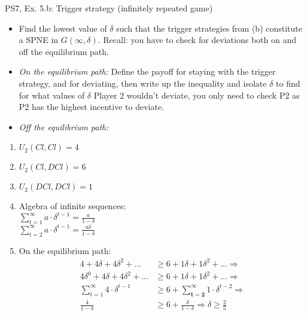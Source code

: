 \begin{frame}{PS7, Ex. 5.b: Trigger strategy (infinitely repeated game)}
    \begin{itemize}
        \item[(b)] Find the lowest value of $\delta$ such that the trigger strategies from (b) constitute a SPNE in $G(\infty,\delta)$. Recall: you have to check for deviations both on and off the equilibrium path.
    \end{itemize}
    \vspace{-8pt}
  \begin{multicols}{2}
    \begin{itemize}
        \item[(Step a)] \textit{On the equilibrium path:} Define the payoff for staying with the trigger strategy, and for deviating, then write up the inequality and isolate $\delta$ to find for what values of $\delta$ Player 2 wouldn't deviate, you only need to check P2 as P2 has the highest incentive to deviate.
        \item[(Step b)] \textit{Off the equilibrium path:}
    \end{itemize}
    \vfill\null\columnbreak
    \begin{enumerate}
        \item $U_2(Cl,Cl) = 4$
        \item $U_2(Cl,DCl) = 6$
        \item $U_2(DCl,DCl) = 1$
        \item Algebra of infinite sequences:\\ $\sum_{t=1}^{\infty} a\cdot\delta^{t-1} = \frac{a}{1-\delta}$ \\ $\sum_{t=2}^{\infty} a\cdot\delta^{t-1} = \frac{a\delta}{1-\delta}$
        \item On the equilibrium path:
        \begin{align*}
            4+4\delta+4\delta^2+...&\geq6+1\delta+1\delta^2+...\Rightarrow\\
            4\delta^0+4\delta+4\delta^2+...&\geq6+1\delta+1\delta^2+...\Rightarrow\\
            \sum_{t=1}^{\infty} 4\cdot\delta^{t-1}&\geq6 + \sum_{\bm{t=2}}^{\infty} 1\cdot\delta^{t-2}\Rightarrow\\
            \frac{4}{1-\delta} &\geq 6 + \frac{\delta}{1-\delta}\Rightarrow
            \delta \geq \frac{2}{5}
        \end{align*}
    \end{enumerate}
    \vfill\null
  \end{multicols}
\end{frame}

